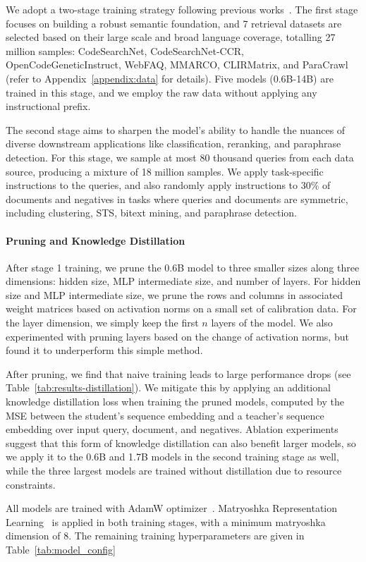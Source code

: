 We adopt a two-stage training strategy following previous works~\citep{2025NV-Embed,2025Qwen3-Embedding}. The first stage focuses on building a robust semantic foundation, and 7 retrieval datasets are selected based on their large scale and broad language coverage, totalling 27 million samples: CodeSearchNet, CodeSearchNet-CCR, OpenCodeGeneticInstruct, WebFAQ, MMARCO, CLIRMatrix, and ParaCrawl (refer to Appendix~\ref{appendix:data} for details). Five models (0.6B-14B) are trained in this stage, and we employ the raw data without applying any instructional prefix.

The second stage aims to sharpen the model's ability to handle the nuances of diverse downstream applications like classification, reranking, and paraphrase detection. For this stage, we sample at most 80 thousand queries from each data source, producing a mixture of 18 million samples. We apply task-specific instructions to the queries, and also randomly apply instructions to 30\% of documents and negatives in tasks where queries and documents are symmetric, including clustering, STS, bitext mining, and paraphrase detection.

\paragraph{Pruning and Knowledge Distillation} After stage 1 training, we prune the 0.6B model to three smaller sizes along three dimensions: hidden size, MLP intermediate size, and number of layers. For hidden size and MLP intermediate size, we prune the rows and columns in associated weight matrices based on activation norms on a small set of calibration data. For the layer dimension, we simply keep the first $n$ layers of the model. We also experimented with pruning layers based on the change of activation norms, but found it to underperform this simple method.

After pruning, we find that naive training leads to large performance drops (see Table~\ref{tab:results-distillation}). We mitigate this by applying an additional knowledge distillation loss when training the pruned models, computed by the MSE between the student's sequence embedding and a teacher's sequence embedding over input query, document, and negatives. Ablation experiments suggest that this form of knowledge distillation can also benefit larger models, so we apply it to the 0.6B and 1.7B models in the second training stage as well, while the three largest models are trained without distillation due to resource constraints.

All models are trained with AdamW optimizer~\citep{2019AdamW}. Matryoshka Representation Learning~\citep{2022MRL} is applied in both training stages, with a minimum matryoshka dimension of 8. The remaining training hyperparameters are given in Table~\ref{tab:model_config}